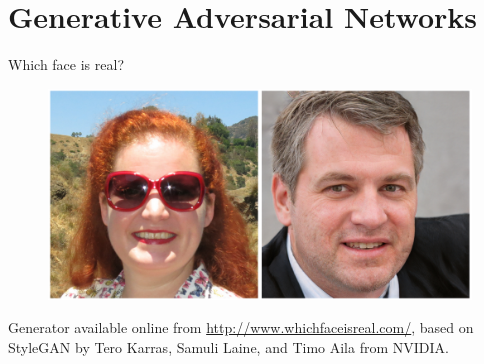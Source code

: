 \documentclass[xcolor=pdftex,dvipsnames,table,mathserif]{beamer}
\begin{document}


\section{Generative Adversarial Networks}

\begin{frame}{Which face is real?}

\begin{figure}[ht]
  \centering
  \includegraphics[width=\textwidth]{../graphics/which_face.png}
\end{figure}

Generator available online from \url{http://www.whichfaceisreal.com/}, based on StyleGAN by Tero Karras, Samuli Laine, and Timo Aila from NVIDIA.

\end{frame}
\end{document}
